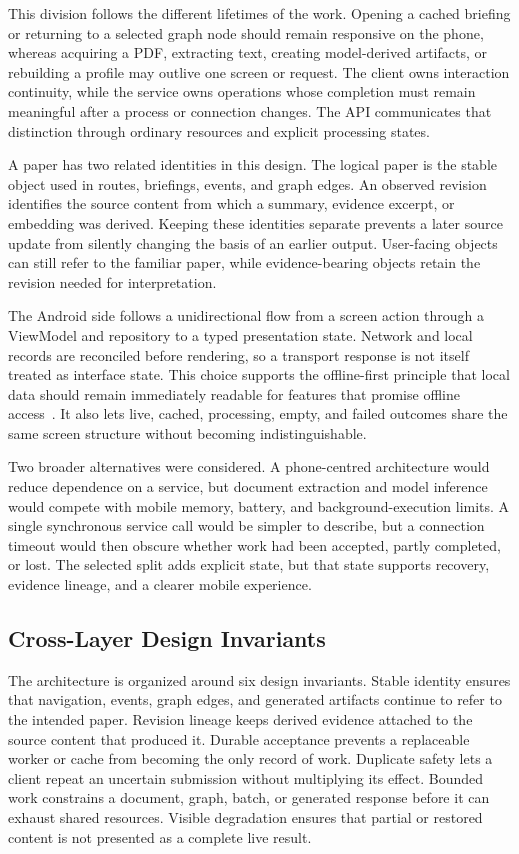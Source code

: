 This division follows the different lifetimes of the work. Opening a cached briefing or returning to a selected graph node should remain responsive on the phone, whereas acquiring a PDF, extracting text, creating model-derived artifacts, or rebuilding a profile may outlive one screen or request. The client owns interaction continuity, while the service owns operations whose completion must remain meaningful after a process or connection changes. The API communicates that distinction through ordinary resources and explicit processing states.

A paper has two related identities in this design. The logical paper is the stable object used in routes, briefings, events, and graph edges. An observed revision identifies the source content from which a summary, evidence excerpt, or embedding was derived. Keeping these identities separate prevents a later source update from silently changing the basis of an earlier output. User-facing objects can still refer to the familiar paper, while evidence-bearing objects retain the revision needed for interpretation.

The Android side follows a unidirectional flow from a screen action through a ViewModel and repository to a typed presentation state. Network and local records are reconciled before rendering, so a transport response is not itself treated as interface state. This choice supports the offline-first principle that local data should remain immediately readable for features that promise offline access~\cite{androidOfflineFirst2026}. It also lets live, cached, processing, empty, and failed outcomes share the same screen structure without becoming indistinguishable.

Two broader alternatives were considered. A phone-centred architecture would reduce dependence on a service, but document extraction and model inference would compete with mobile memory, battery, and background-execution limits. A single synchronous service call would be simpler to describe, but a connection timeout would then obscure whether work had been accepted, partly completed, or lost. The selected split adds explicit state, but that state supports recovery, evidence lineage, and a clearer mobile experience.

\subsection{Cross-Layer Design Invariants}

The architecture is organized around six design invariants. Stable identity ensures that navigation, events, graph edges, and generated artifacts continue to refer to the intended paper. Revision lineage keeps derived evidence attached to the source content that produced it. Durable acceptance prevents a replaceable worker or cache from becoming the only record of work. Duplicate safety lets a client repeat an uncertain submission without multiplying its effect. Bounded work constrains a document, graph, batch, or generated response before it can exhaust shared resources. Visible degradation ensures that partial or restored content is not presented as a complete live result.

